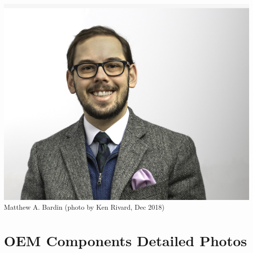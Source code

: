    \begin{center}
   \vspace{5mm}
       \includegraphics[scale=0.5]{Matt Bardin_web_head_4370.jpg}\\
        Matthew A. Bardin (photo by Ken Rivard, Dec 2018)
   \end{center}








\section{OEM Components Detailed Photos}




